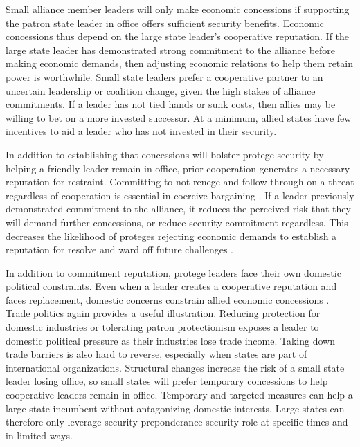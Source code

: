 \documentclass[12pt]{article}
\begin{document}
Small alliance member leaders will only make economic concessions if supporting the patron state leader in office offers sufficient security benefits. 
Economic concessions thus depend on the large state leader's cooperative reputation. 
If the large state leader has demonstrated strong commitment to the alliance before making economic demands, then adjusting economic relations to help them retain power is worthwhile.
Small state leaders prefer a cooperative partner to an uncertain leadership or coalition change, given the high stakes of alliance commitments.
If a leader has not tied hands or sunk costs, then allies may be willing to bet on a more invested successor. 
At a minimum, allied states have few incentives to aid a leader who has not invested in their security. 


In addition to establishing that concessions will bolster protege security by helping a friendly leader remain in office, prior cooperation generates a necessary reputation for restraint. 
Committing to not renege and follow through on a threat regardless of cooperation is essential in coercive bargaining \citep{Cebuletal2021}. 
If a leader previously demonstrated commitment to the alliance, it reduces the perceived risk that they will demand further concessions, or reduce security commitment regardless.
This decreases the likelihood of proteges rejecting economic demands to establish a reputation for resolve and ward off future challenges \citep{Sechser2010, Sechser2018}. 


In addition to commitment reputation, protege leaders face their own domestic political constraints. 
Even when a leader creates a cooperative reputation and faces replacement, domestic concerns constrain allied economic concessions \citep{Davis2008}. 
Trade politics again provides a useful illustration.
Reducing protection for domestic industries or tolerating patron protectionism exposes a leader to domestic political pressure as their industries lose trade income.
Taking down trade barriers is also hard to reverse, especially when states are part of international organizations.
Structural changes increase the risk of a small state leader losing office, so small states will prefer temporary concessions to help cooperative leaders remain in office.
Temporary and targeted measures can help a large state incumbent without antagonizing domestic interests. 
Large states can therefore only leverage security preponderance security role at specific times and in limited ways.
\end{document}
